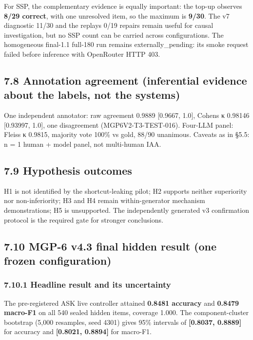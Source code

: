 For SSP, the complementary evidence is equally important: the top-up
observes \textbf{8/29 correct}, with one unresolved item, so the maximum
is \textbf{9/30}. The v7 diagnostic 11/30 and the
replay\textquotesingle s 0/19 repairs remain useful for causal
investigation, but no SSP count can be carried across configurations.
The homogeneous final-1.1 full-180 run remains externally\_pending: its
smoke request failed before inference with OpenRouter HTTP 403.

\subsection{7.8 Annotation agreement (inferential evidence about the
labels, not the
systems)}\label{annotation-agreement-inferential-evidence-about-the-labels-not-the-systems}

One independent annotator: raw agreement 0.9889 {[}0.9667, 1.0{]},
Cohen\textquotesingle s κ 0.98146 {[}0.93997, 1.0{]}, one disagreement
(MGP6V2-T3-TEST-016). Four-LLM panel: Fleiss κ 0.9815, majority vote
100\% vs gold, 88/90 unanimous. Caveats as in §5.5: n = 1 human + model
panel, not multi-human IAA.

\subsection{7.9 Hypothesis outcomes}\label{hypothesis-outcomes}

H1 is not identified by the shortcut-leaking pilot; H2 supports neither
superiority nor non-inferiority; H3 and H4 remain within-generator
mechanism demonstrations; H5 is unsupported. The independently generated
v3 confirmation protocol is the required gate for stronger conclusions.

\subsection{7.10 MGP-6 v4.3 final hidden result (one frozen
configuration)}\label{mgp-6-v4.3-final-hidden-result-one-frozen-configuration}

\subsubsection{7.10.1 Headline result and its
uncertainty}\label{headline-result-and-its-uncertainty}

The pre-registered ASK live controller attained \textbf{0.8481 accuracy}
and \textbf{0.8479 macro-F1} on all 540 sealed hidden items, coverage
1.000. The component-cluster bootstrap (5,000 resamples, seed 4301)
gives 95\% intervals of \textbf{{[}0.8037, 0.8889{]}} for accuracy and
\textbf{{[}0.8021, 0.8894{]}} for macro-F1.

